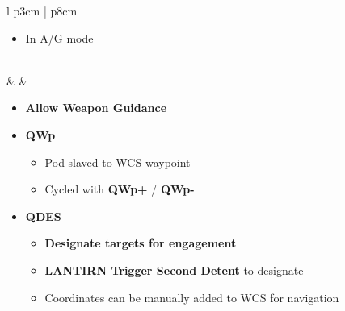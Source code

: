 \documentclass[8pt,usenames,dvipsnames,twoside]{article}
\begin{document}
\begin{center}
\begin{longtable}{l p{3cm} | p{8cm}}
\begin{minipage}[t]{\linewidth}
\begin{itemize}
\begin{itemize}
							\item In A/G mode
						\end{itemize}
					\end{itemize} 
				\end{minipage} \\
				\midrule
				\textbullet &  & 
				\begin{minipage}[t]{\linewidth}
					\vspace{-7pt}
					\begin{itemize}
						\item \textbf{Allow Weapon Guidance}
						\item \textbf{QWp}
						\begin{itemize}
							\item Pod slaved to WCS waypoint 
							\item Cycled with \textbf{QWp+} / \textbf{QWp-}
						\end{itemize}
						\item \textbf{QDES}
						\begin{itemize}
							\item \textbf{Designate targets for engagement}
							\item \textbf{LANTIRN Trigger Second Detent} to designate
							\item Coordinates can be manually added to WCS for navigation
						\end{itemize}
					\end{itemize} 
				\end{minipage} \\
				\bottomrule
			\end{longtable}
		\end{center}
		
		\clearpage
		
		\hypertarget{subsec:lantirnlasingdesignation}{}
\end{document}

